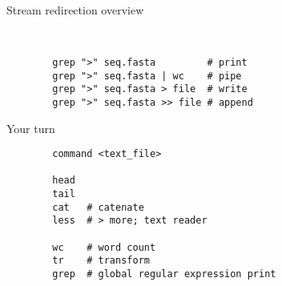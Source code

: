 \documentclass[xcolor=dvipsnames]{beamer}
\begin{document}
\begin{frame}[fragile]
	\huge
	Stream redirection overview
	\Large
	\begin{verbatim}
		
	
		grep ">" seq.fasta         # print
		grep ">" seq.fasta | wc    # pipe
		grep ">" seq.fasta > file  # write
		grep ">" seq.fasta >> file # append
	\end{verbatim}
\end{frame}

\begin{frame}[fragile]
	\huge
	Your turn
	\Large
	\begin{verbatim}
		command <text_file>	
	
		head 
		tail 
		cat   # catenate
		less  # > more; text reader
		
		wc    # word count
		tr    # transform
		grep  # global regular expression print 
	\end{verbatim}
\end{frame}
\end{document}

